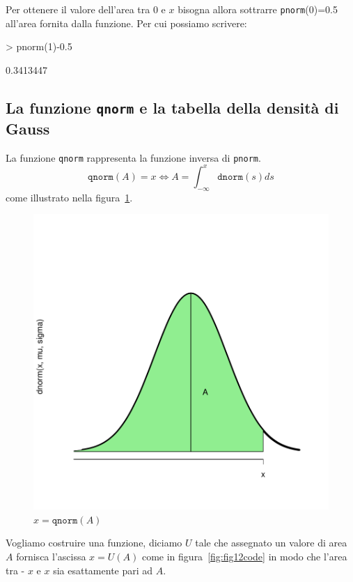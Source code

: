 \documentclass[onecolumn,12pt]{book}
\begin{document}
Per ottenere il valore dell'area tra 0 e $x$ bisogna allora sottrarre \texttt{pnorm}(0)=0.5 all'area fornita dalla funzione.
Per cui possiamo scrivere:
\begin{Schunk}
\begin{Sinput}
> pnorm(1)-0.5
\end{Sinput}
\begin{Soutput}
[1] 0.3413447
\end{Soutput}
\end{Schunk}


\subsection{La funzione \texttt{qnorm} e la tabella della densit\`a di Gauss}

La funzione \texttt{qnorm} rappresenta la funzione inversa di \texttt{pnorm}.
\[\texttt{qnorm}(A)=x\Leftrightarrow A=\int_{-\infty}^x \texttt{dnorm}(s)ds\] 
come illustrato nella figura~\ref{fig:fig2code}.
\begin{center}
\begin{figure}[H]
\includegraphics{RbookParte2-153}
\caption{$x=\texttt{qnorm}(A)$}
\label{fig:fig2code}
\end{figure}
\end{center}
Vogliamo costruire una funzione, diciamo $U$ tale che assegnato un valore di area $A$   fornisca l'ascissa $x=U(A)$ come in figura~\ref{fig:fig12code} in modo che l'area tra - $x$ e $x$ sia esattamente pari ad $A$.  
\end{document}
